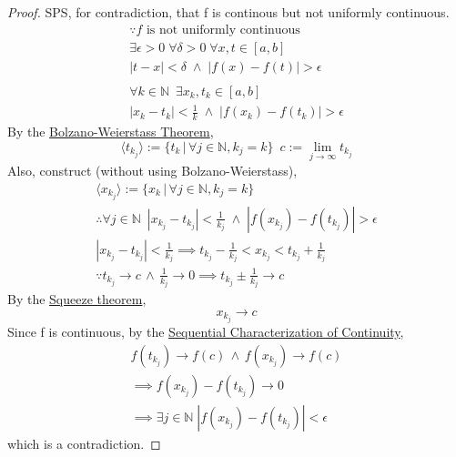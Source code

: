 \documentclass[11pt, oneside]{book}
\theoremstyle{break}
\newtheorem*{proof}{Proof}
\newcommand{\bb}[1]{\mathbb{#1}}			%
\begin{document}
\begin{proof}
	SPS, for contradiction, that f is continous but not uniformly continuous.
	\begin{gather*}
		\because f \text{ is not uniformly continuous} \\
		\exists \epsilon > 0 \; \forall \delta > 0 \; \forall x, t \in [a, b] \\
		|t - x| < \delta \; \land \; |f(x) - f(t)| > \epsilon \\
		\\
		\forall k \in \bb{N} \enspace \exists x_k, t_k \in [a, b] \\
		|x_k - t_k| < \frac{1}{k} \; \land \; |f(x_k) - f(t_k)| > \epsilon
	\end{gather*}
	By the \hyperref[bolzano-weierstass_R]{Bolzano-Weierstass Theorem},
	\begin{equation*}
		\langle t_{k_j} \rangle := \{t_k \, | \, \forall j \in \bb{N}, k_j = k \} \enspace c := \lim_{j \to \infty} t_{k_j}
	\end{equation*}
	Also, construct (without using Bolzano-Weierstass),
	\begin{gather*}
		\langle x_{k_j} \rangle := \{x_k \, | \, \forall j \in \bb{N}, k_j = k \} \\
		\therefore \forall j \in \bb{N} \enspace |x_{k_j} - t_{k_j}| < \frac{1}{k_j} \; \land \; |f(x_{k_j}) - f(t_{k_j})| > \epsilon \\
		|x_{k_j} - t_{k_j}| < \frac{1}{k_j} \implies t_{k_j} - \frac{1}{k_j} < x_{k_j} < t_{k_j} + \frac{1}{k_j} \\
		\because t_{k_j} \to c \, \land \, \frac{1}{k_j} \to 0 \implies t_{k_j} \pm \frac{1}{k_j} \to c
	\end{gather*}
	By the \hyperref[squeeze_seq]{Squeeze theorem},
	\begin{equation*}
		x_{k_j} \to c
	\end{equation*}
	Since f is continuous, by the \hyperref[seq_char_cts]{Sequential Characterization of Continuity},
	\begin{gather*}
		f(t_{k_j}) \to f(c) \, \land \, f(x_{k_j}) \to f(c) \\
		\implies f(x_{k_j}) - f(t_{k_j}) \to 0 \\
		\implies \exists j \in \bb{N} \; |f(x_{k_j}) - f(t_{k_j})| < \epsilon
	\end{gather*}
	which is a contradiction.
\end{proof}

\end{document}
